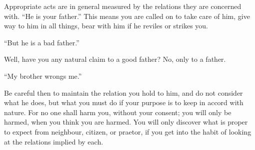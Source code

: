 Appropriate acts  are in general measured  by the relations they  are concerned
with. ``He is your father.'' This means you  are called on to take care of him,
give way to him in all things, bear with him if he reviles or strikes you.

``But he is a bad father.''

Well, have you any natural claim to a good father? No, only to a father.

``My brother wrongs me.''

Be careful then to  maintain the relation you hold to him,  and do not consider
what he does,  but what you must do  if your purpose is to keep  in accord with
nature. For  no one  shall harm  you, without  your consent;  you will  only be
harmed, when you think you are harmed. You will only discover what is proper to
expect  from neighbour,  citizen, or  praetor,  if you  get into  the habit  of
looking at the relations implied by each.
